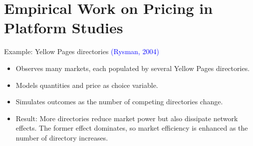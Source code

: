 \documentclass[aspectratio=169]{beamer}  %
\begin{document}
\section{Empirical Work on Pricing in Platform Studies}
            
\begin{frame}{Example: Yellow Pages directories \textcolor{blue}{(Rysman, 2004)}}
    \begin{itemize}
        \item Observes many markets, each populated by several Yellow Pages directories.
        \item Models quantities and price as choice variable.
        \item Simulates outcomes as the number of competing directories change.
        \item Result: More directories reduce market power but also dissipate network effects. The former effect dominates, so market efficiency is enhanced as the number of directory increases.
    \end{itemize}
\end{frame}
\end{document}
